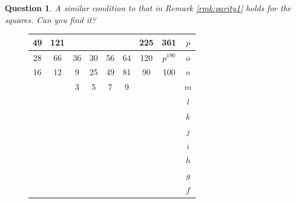 \documentclass[12pt]{article}
\newtheorem{question}{Question}
\begin{document}
\begin{question}
  \label{question:parity1}
A similar condition to that in Remark \ref{rmk:parity1}
holds for the squares. Can you find it?
\end{question}  



\begin{figure}[h!] 
\centering 
\begin{tabular}{|c|c|c|c|c|c|c|c||c} \hline
\squadfill{\,}49 & \squadfill{\,}121 & \quad  & \quad  & \quad  & \quad  & \squadfill{\,}225 & \squadfill{\,}361 & $p$ \\ \hline
\squadfill{\,}28 & \squadfill{\,}66 & \trianglepafill{\,}36 & \trianglepafill{\,}30 & \trianglepafill{\,}56 & \trianglepafill{\,}64 & \squadfill{\,}120 & \rhombusfill{\,}$p^{190}$ & $o$ \\ \hline
\trianglepafill{\,}16 & \trianglepafill{\,}12 & \circletfill{\,}9 & \circletfill{\,}25 & \circletfill{\,}49 & \circletfill{\,}81 & \trianglepafill{\,}90 & \trianglepafill{\,}100 & $n$ \\ \hline
\quad  & \quad  & \circletfill{\,}3 & \circletfill{\,}5 & \circletfill{\,}7 & \circletfill{\,}9 & \quad  & \quad  & $m$ \\ \hline
\quad  & \quad  & \quad  & \quad  & \quad  & \quad  & \quad  & \quad  & $l$ \\ \hline
\quad  & \quad  & \quad  & \quad  & \quad  & \quad  & \quad  & \quad  & $k$ \\ \hline
\quad  & \quad  & \quad  & \quad  & \quad  & \quad  & \quad  & \quad  & $j$ \\ \hline
\quad  & \quad  & \quad  & \quad  & \quad  & \quad  & \quad  & \quad  & $i$ \\ \hline
\quad  & \quad  & \quad  & \quad  & \quad  & \quad  & \quad  & \quad  & $h$ \\ \hline
\quad  & \quad  & \quad  & \quad  & \quad  & \quad  & \quad  & \quad  & $g$ \\ \hline
\quad  & \quad  & \quad  & \quad  & \quad  & \quad  & \quad  & \quad  & $f$ \\ \hline

\end{tabular}
\end{figure}
\end{document}
